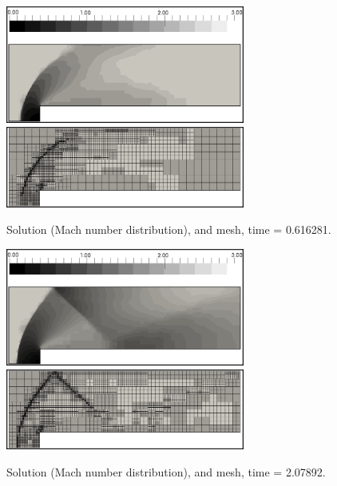 \begin{figure}[H]
\begin{center}
\includegraphics[width=0.7\textwidth]{examples_img/forward-step/sln1.png}\\
\vspace{2mm}
\includegraphics[width=0.7\textwidth]{examples_img/forward-step/mesh1.png}
\end{center}

\caption{Solution (Mach number distribution), and mesh, time = 0.616281.}

\label{fig:ffs-1}
\end{figure}

\begin{figure}[H]
\begin{center}
\includegraphics[width=0.7\textwidth]{examples_img/forward-step/sln2.png}\\
\vspace{2mm}
\includegraphics[width=0.7\textwidth]{examples_img/forward-step/mesh2.png}
\end{center}

\caption{Solution (Mach number distribution), and mesh, time = 2.07892.}

\label{fig:ffs-2}
\end{figure}

